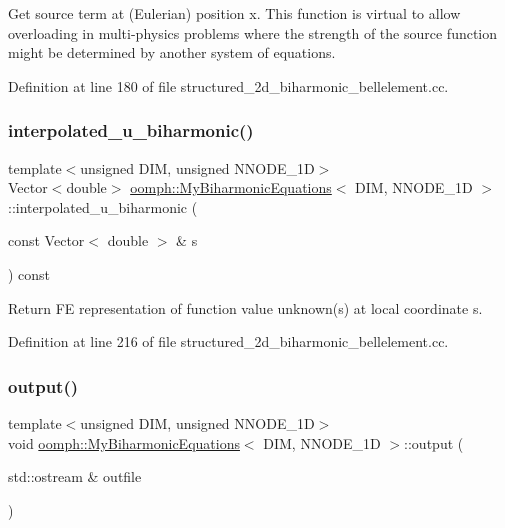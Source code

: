 Get source term at (Eulerian) position x. This function is virtual to allow overloading in multi-\/physics problems where the strength of the source function might be determined by another system of equations. 

Definition at line 180 of file structured\+\_\+2d\+\_\+biharmonic\+\_\+bellelement.\+cc.

\mbox{\label{classoomph_1_1MyBiharmonicEquations_ac451e7d6ebf1dd94f0a0c122e3882d53}} 
\subsubsection{\texorpdfstring{interpolated\+\_\+u\+\_\+biharmonic()}{interpolated\_u\_biharmonic()}}
{\footnotesize\ttfamily template$<$unsigned D\+IM, unsigned N\+N\+O\+D\+E\+\_\+1D$>$ \\
Vector$<$double$>$ \hyperlink{classoomph_1_1MyBiharmonicEquations}{oomph\+::\+My\+Biharmonic\+Equations}$<$ D\+IM, N\+N\+O\+D\+E\+\_\+1D $>$\+::interpolated\+\_\+u\+\_\+biharmonic (\begin{DoxyParamCaption}\item[{const Vector$<$ double $>$ \&}]{s }\end{DoxyParamCaption}) const\hspace{0.3cm}{\ttfamily [inline]}}



Return FE representation of function value unknown(s) at local coordinate s. 



Definition at line 216 of file structured\+\_\+2d\+\_\+biharmonic\+\_\+bellelement.\+cc.

\mbox{\label{classoomph_1_1MyBiharmonicEquations_aa0d1248dcc8fcebd986c295d6af2ebf6}} 
\subsubsection{\texorpdfstring{output()}{output()}\hspace{0.1cm}{\footnotesize\ttfamily [1/4]}}
{\footnotesize\ttfamily template$<$unsigned D\+IM, unsigned N\+N\+O\+D\+E\+\_\+1D$>$ \\
void \hyperlink{classoomph_1_1MyBiharmonicEquations}{oomph\+::\+My\+Biharmonic\+Equations}$<$ D\+IM, N\+N\+O\+D\+E\+\_\+1D $>$\+::output (\begin{DoxyParamCaption}\item[{std\+::ostream \&}]{outfile }\end{DoxyParamCaption})\hspace{0.3cm}{\ttfamily [inline]}}




